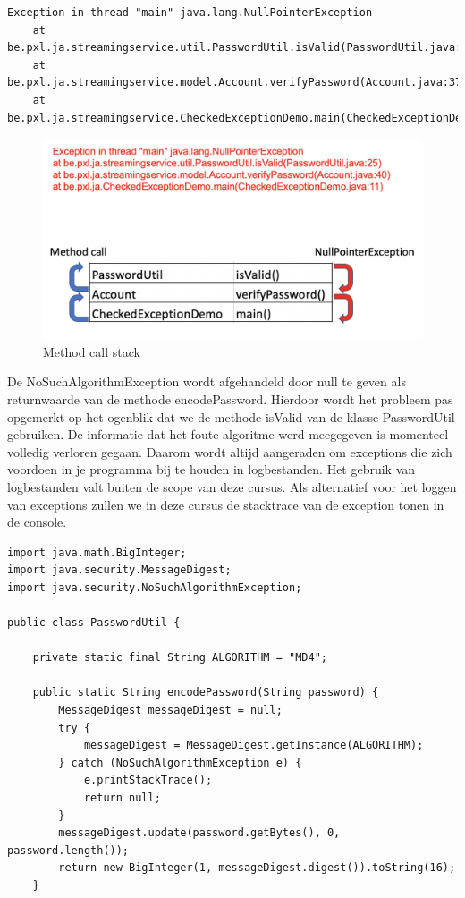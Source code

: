 \begin{itemize}
{\begin{verbatim}
Exception in thread "main" java.lang.NullPointerException
	at be.pxl.ja.streamingservice.util.PasswordUtil.isValid(PasswordUtil.java:24)
	at be.pxl.ja.streamingservice.model.Account.verifyPassword(Account.java:37)
	at be.pxl.ja.streamingservice.CheckedExceptionDemo.main(CheckedExceptionDemo.java:9)
\end{verbatim}

\begin{figure}[H]
\includegraphics[width=\linewidth]{images/h2/exception_call_stack.png}
\caption{Method call stack}
\label{fig:method_call_stack}
\end{figure}

De NoSuchAlgorithmException wordt afgehandeld door null te geven als returnwaarde van de methode encodePassword.  Hierdoor wordt het probleem pas opgemerkt op het ogenblik dat we de methode isValid van de klasse PasswordUtil gebruiken. De informatie dat het foute algoritme werd meegegeven is momenteel volledig verloren gegaan. Daarom wordt altijd aangeraden om exceptions die zich voordoen in je programma bij te houden in logbestanden. Het gebruik van logbestanden valt buiten de scope van deze cursus. Als alternatief voor het loggen van exceptions zullen we in deze cursus de stacktrace van de exception tonen in de console.

\begin{lstlisting}
import java.math.BigInteger;
import java.security.MessageDigest;
import java.security.NoSuchAlgorithmException;

public class PasswordUtil {

	private static final String ALGORITHM = "MD4";

	public static String encodePassword(String password) {
		MessageDigest messageDigest = null;
		try {
			messageDigest = MessageDigest.getInstance(ALGORITHM);
		} catch (NoSuchAlgorithmException e) {
			e.printStackTrace();
			return null;
		}
		messageDigest.update(password.getBytes(), 0, password.length());
		return new BigInteger(1, messageDigest.digest()).toString(16);
	}


\end{lstlisting}}
\end{itemize}
